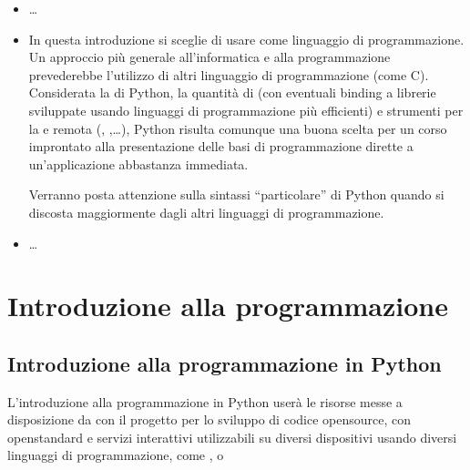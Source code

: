 \documentclass[letterpaper,10pt,english]{jupyterBook}
\begin{document}
\sphinxAtStartPar
{}



\sphinxAtStartPar
{}
\begin{itemize}
\item {} 
\sphinxAtStartPar
{} …

\item {} 
\sphinxAtStartPar
{} In questa introduzione si sceglie di usare  come linguaggio di programmazione.
Un approccio più generale all’informatica e alla programmazione prevederebbe l’utilizzo di altri linguaggio di programmazione (come C).
Considerata la  di Python, la quantità di  (con eventuali binding a librerie sviluppate usando linguaggi di programmazione più efficienti) e strumenti per la  e remota (, ,…), Python risulta comunque una buona scelta per un corso improntato alla presentazione delle basi di programmazione dirette a un’applicazione abbastanza immediata.

\sphinxAtStartPar
Verranno posta attenzione sulla sintassi “particolare” di Python quando si discosta maggiormente dagli altri linguaggi di programmazione.

\item {} 
\sphinxAtStartPar
{} …

\end{itemize}

\sphinxstepscope


\part{Introduzione alla programmazione}

\sphinxstepscope


\chapter{Introduzione alla programmazione \sphinxhyphen{} in Python}
\label{\detokenize{ch/programming:introduzione-alla-programmazione-in-python}}\label{\detokenize{ch/programming:book-programming-intro-hs}}\label{\detokenize{ch/programming::doc}}
\sphinxAtStartPar
L’introduzione alla programmazione in Python userà le risorse messe a disposizione da  con il progetto  per lo sviluppo di codice open\sphinxhyphen{}source, con open\sphinxhyphen{}standard e servizi interattivi utilizzabili su diversi dispositivi usando diversi linguaggi di programmazione, come ,  o 
\end{document}
